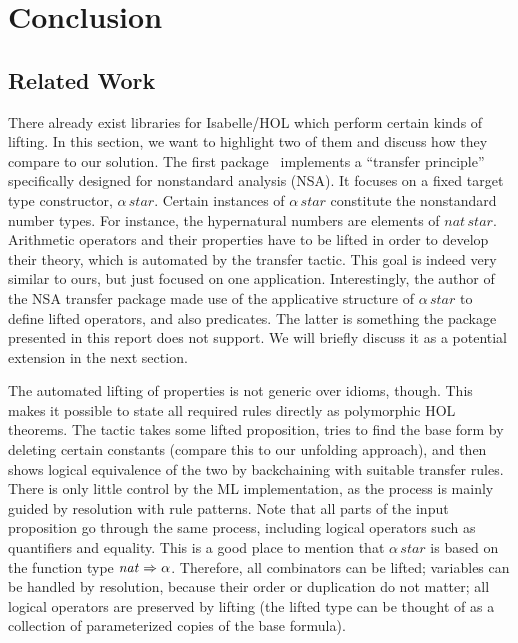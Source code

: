 \chapter{Conclusion}\label{sec:conclusion}

\section{Related Work}\label{subsec:related-work}

There already exist libraries for Isabelle/HOL which perform certain kinds of
lifting.
In this section, we want to highlight two of them and discuss how they compare
to our solution.
The first package~\cite{huffman05} implements a ``transfer principle''
specifically designed for nonstandard analysis (NSA).
It focuses on a fixed target type constructor, $\alpha\,\mathit{star}$.
Certain instances of $\alpha\,\mathit{star}$ constitute the nonstandard number
types.
For instance, the hypernatural numbers are elements of $\mathit{nat}\,\mathit{star}$.
Arithmetic operators and their properties have to be lifted in order to develop
their theory, which is automated by the transfer tactic.
This goal is indeed very similar to ours, but just focused on one application.
Interestingly, the author of the NSA transfer package made use of the applicative
structure of $\alpha\,\mathit{star}$ to define lifted operators, and also predicates.
The latter is something the package presented in this report does not support.
We will briefly discuss it as a potential extension in the next section.

The automated lifting of properties is not generic over idioms, though.
This makes it possible to state all required rules directly as polymorphic
HOL theorems.
The tactic takes some lifted proposition, tries to find the base form by
deleting certain constants (compare this to our unfolding approach), and then
shows logical equivalence of the two by backchaining with suitable transfer
rules.
There is only little control by the ML implementation, as the process is mainly
guided by resolution with rule patterns.
Note that all parts of the input proposition go through the same process,
including logical operators such as quantifiers and equality.
This is a good place to mention that $\alpha\,\mathit{star}$ is based
on the function type $\mathit{nat} \Rightarrow \alpha$.
Therefore, all combinators can be lifted; variables can be handled by
resolution, because their order or duplication do not matter; all logical
operators are preserved by lifting (the lifted type can be thought of
as a collection of parameterized copies of the base formula).

